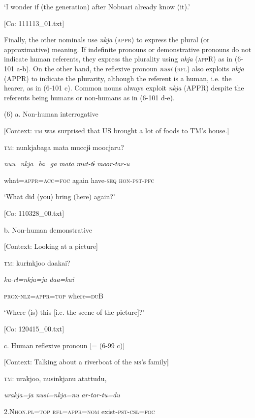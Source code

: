       ‘I wonder if (the generation) after Nobuari already know (it).’

      [Co: 111113\_01.txt]

  Finally, the other nominals use \textit{nkja} (\textsc{appr}) to express the plural (or approximative) meaning. If indefinite pronouns or demonstrative pronouns do not indicate human referents, they express the plurality using \textit{nkja} (\textsc{app}R) as in (6-101 a-b). On the other hand, the reflexive pronoun \textit{nusi} (\textsc{rfl}) also exploits \textit{nkja} (APPR) to indicate the plurarity, although the referent is a human, i.e. the hearer, as in (6-101 c). Common nouns always exploit \textit{nkja} (APPR) despite the referents being humans or non-humans as in (6-101 d-e).

(6)  a.  Non-human interrogative

    [Context: \textsc{tm} was surprised that US brought a lot of foods to TM’s house.]

    \textsc{tm}:  nunkjabaga  mata  muccjɨ  moocjaru?

      \textit{nuu=nkja=ba=ga}  \textit{mata}  \textit{mut-tɨ}  \textit{moor-tar-u}

      what=\textsc{appr}=\textsc{acc}=\textsc{foc}  again  have-\textsc{seq}  \textsc{hon}-\textsc{pst}-\textsc{pfc}

      ‘What did (you) bring (here) again?’

      [Co: 110328\_00.txt]

  b.  Non-human demonstrative

    [Context: Looking at a picture]

    \textsc{tm}:  kurɨnkjoo  daakai?

      \textit{ku-rɨ=nkja=ja}  \textit{daa=kai}

      \textsc{prox}-\textsc{nlz}=\textsc{appr}=\textsc{top}  where=\textsc{du}B

      ‘Where (is) this [i.e. the scene of the picture]?’

      [Co: 120415\_00.txt]

  c.  Human reflexive pronoun [= (6-99 c)]

    [Context: Talking about a riverboat of the \textsc{ms}’s family]

    \textsc{tm}:  urakjoo,  nusinkjanu  atattudu,

      \textit{urakja=ja}  \textit{nusi=nkja=nu}  \textit{ar-tar-tu=du}

      2.N\textsc{hon}.\textsc{pl}=\textsc{top}  \textsc{rfl}=\textsc{appr}=\textsc{nom}  exist-\textsc{pst}-\textsc{csl}=\textsc{foc}

